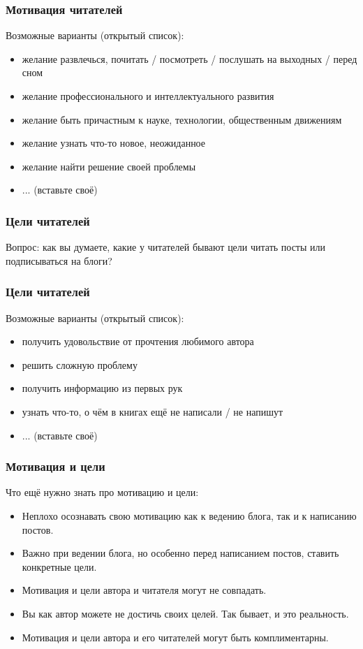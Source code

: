 \documentclass[12pt]{beamer}
\begin{document}
\begin{frame}
  \frametitle{Мотивация читателей}
  Возможные варианты (открытый список):
  \begin{itemize}
  \item желание развлечься, почитать / посмотреть / послушать на выходных / перед сном
  \item желание профессионального и интеллектуального развития
  \item желание быть причастным к науке, технологии, общественным движениям
  \item желание узнать что-то новое, неожиданное
  \item желание найти решение своей проблемы
  \item ... (вставьте своё)
  \end{itemize}
\end{frame}

\begin{frame}
  \frametitle{Цели читателей}
  Вопрос: как вы думаете, какие у читателей бывают цели читать посты или подписываться на блоги?
\end{frame}

\begin{frame}
  \frametitle{Цели читателей}
  Возможные варианты (открытый список):
  \begin{itemize}
  \item получить удовольствие от прочтения любимого автора
  \item решить сложную проблему
  \item получить информацию из первых рук
  \item узнать что-то, о чём в книгах ещё не написали / не напишут
  \item ... (вставьте своё)
  \end{itemize}
\end{frame}

\begin{frame}
  \frametitle{Мотивация и цели}
  Что ещё нужно знать про мотивацию и цели:
  \begin{itemize}
  \item Неплохо осознавать свою мотивацию как к ведению блога, так и к написанию постов.
  \item Важно при ведении блога, но особенно перед написанием постов, ставить конкретные цели.
  \item Мотивация и цели автора и читателя могут не совпадать.
  \item Вы как автор можете не достичь своих целей. Так бывает, и это реальность.
  \item Мотивация и цели автора и его читателей могут быть комплиментарны.
  \end{itemize}
\end{frame}
\end{document}
